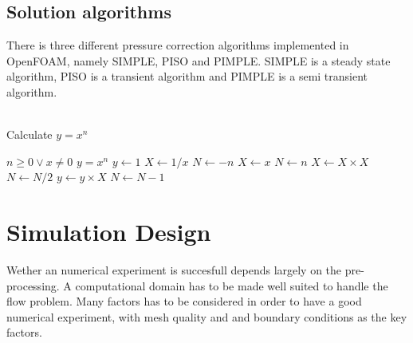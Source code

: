 \documentclass[a4paper, 12pt]{report}
\begin{document}
\section{Solution algorithms}
There is three different pressure correction algorithms implemented in OpenFOAM, namely SIMPLE, PISO and PIMPLE. SIMPLE is a steady state algorithm, PISO is a transient algorithm and PIMPLE is a semi transient algorithm.\\
\\
\begin{algorithm}
\caption{Calculate $y = x^n$}
\begin{algorithmic}
\REQUIRE $n \geq 0 \vee x \neq 0$
\ENSURE $y = x^n$
\STATE $y \leftarrow 1$
\STATE $X \leftarrow 1 / x$
\STATE $N \leftarrow -n$
\ELSE
\STATE $X \leftarrow x$
\STATE $N \leftarrow n$
\ENDIF
{}
\STATE $X \leftarrow X \times X$
\STATE $N \leftarrow N / 2$
\ELSE[$N$ is odd]
\STATE $y \leftarrow y \times X$
\STATE $N \leftarrow N - 1$
\ENDIF
\ENDWHILE
\end{algorithmic}
\end{algorithm}

\chapter{Simulation Design}
Wether an numerical experiment is succesfull depends largely on the pre-processing. A computational domain has to be made well suited to handle the flow problem. Many factors has to be considered in order to have a good numerical experiment, with mesh quality and and boundary conditions as the key factors.
\end{document}
